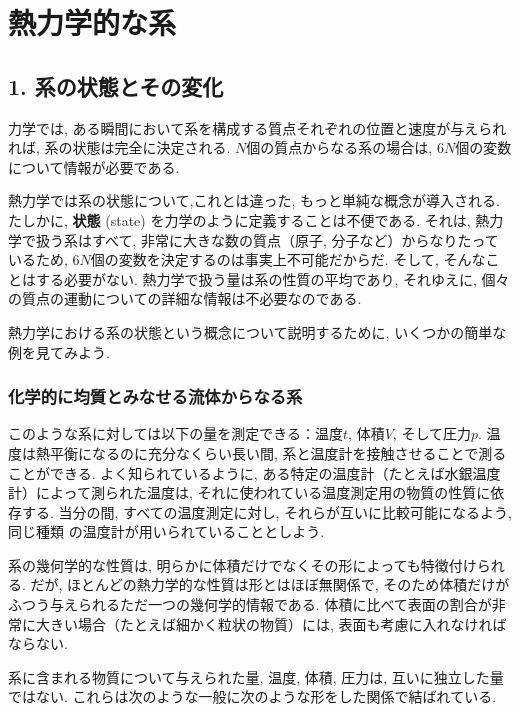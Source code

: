 
\chapter{熱力学的な系}
\section*{1. 系の状態とその変化}
力学では, ある瞬間において系を構成する質点それぞれの位置と速度が与えられれば, 系の状態は完全に決定される. $N$個の質点からなる系の場合は, $6N$個の変数について情報が必要である.\par
熱力学では系の状態について,これとは違った, もっと単純な概念が導入される. たしかに, \textbf{状態} (state) を力学のように定義することは不便である. それは, 熱力学で扱う系はすべて, 非常に大きな数の質点（原子, 分子など）からなりたっているため, $6N$個の変数を決定するのは事実上不可能だからだ. そして, そんなことはする必要がない. 熱力学で扱う量は系の性質の平均であり, それゆえに, 個々の質点の運動についての詳細な情報は不必要なのである.\par
熱力学における系の状態という概念について説明するために, いくつかの簡単な例を見てみよう.\par

\subsection*{化学的に均質とみなせる流体からなる系}
このような系に対しては以下の量を測定できる：温度$t$, 体積$V$, そして圧力$p$. 温度は熱平衡になるのに充分なくらい長い間, 系と温度計を接触させることで測ることができる. よく知られているように, ある特定の温度計（たとえば水銀温度計）によって測られた温度は, それに使われている温度測定用の物質の性質に依存する. 当分の間, すべての温度測定に対し, それらが互いに比較可能になるよう, 同じ種類
の温度計が用いられていることとしよう.\par
系の幾何学的な性質は, 明らかに体積だけでなくその形によっても特徴付けられる. だが, ほとんどの熱力学的な性質は形とはほぼ無関係で, そのため体積だけがふつう与えられるただ一つの幾何学的情報である. 体積に比べて表面の割合が非常に大きい場合（たとえば細かく粒状の物質）には, 表面も考慮に入れなければならない.\par
系に含まれる物質について与えられた量, 温度, 体積, 圧力は, 互いに独立した量ではない. これらは次のような一般に次のような形をした関係で結ばれている.

